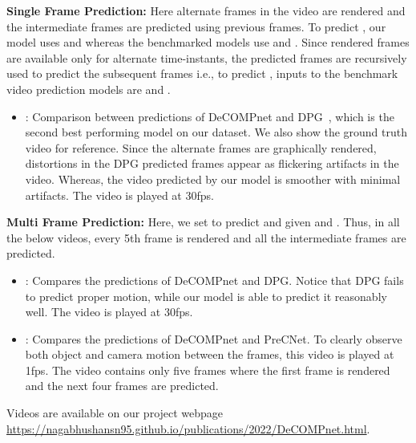 \documentclass[preprint]{vgtc}
\def\ie{i.e., }
\begin{document}
    \textbf{Single Frame Prediction:}
    Here alternate frames in the video are rendered and the intermediate frames are predicted using previous frames.
    To predict , our model uses  and  whereas the benchmarked models use  and .
    Since rendered frames are available only for alternate time-instants, the predicted frames are recursively used to predict the subsequent frames \ie to predict , inputs to the benchmark video prediction models are  and .
    \begin{itemize}
        \item {}: Comparison between predictions of DeCOMPnet and DPG~\cite{gao2019disentangling}, which is the second best performing model on our dataset.
        We also show the ground truth video for reference.
        Since the alternate frames are graphically rendered, distortions in the DPG predicted frames appear as flickering artifacts in the video.
        Whereas, the video predicted by our model is smoother with minimal artifacts.
        The video is played at 30fps.
    \end{itemize}

    \textbf{Multi Frame Prediction:}
    Here, we set  to predict  and  given  and .
    Thus, in all the below videos, every 5th frame is rendered and all the intermediate frames are predicted.
    \begin{itemize}
        \item {}: Compares the predictions of DeCOMPnet and DPG\@.
        Notice that DPG fails to predict proper motion, while our model is able to predict it reasonably well.
        The video is played at 30fps.
        \item {}: Compares the predictions of DeCOMPnet and PreCNet.
        To clearly observe both object and camera motion between the frames, this video is played at 1fps.
        The video contains only five frames where the first frame is rendered and the next four frames are predicted.
    \end{itemize}

Videos are available on our project webpage \url{https://nagabhushansn95.github.io/publications/2022/DeCOMPnet.html}.
\end{document}
